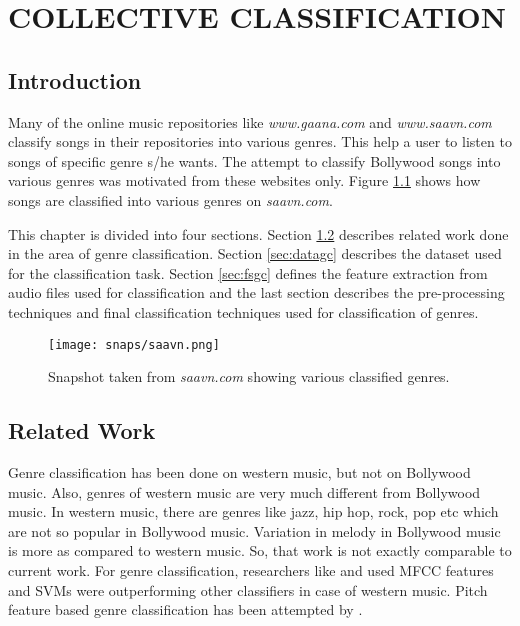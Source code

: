 \chapter{COLLECTIVE CLASSIFICATION}
 \label{chap:collective}
\section{Introduction}
Many of the online music repositories like \textit{www.gaana.com} and \textit{www.saavn.com} classify songs in their repositories into various genres. This help a user to listen to songs of specific genre s/he wants. The attempt to classify Bollywood songs into various genres was motivated from these websites only. Figure 
\ref{fig:saavn} shows how songs are classified into various genres on \textit{saavn.com}. 
\par This chapter is divided into four sections. Section \ref{sec:rwgc} describes related work done in the area of genre classification. Section \ref{sec:datagc} describes the dataset used for the classification task. Section \ref{sec:fsgc} defines the feature extraction from audio files used for classification and the last section describes the pre-processing techniques and final classification techniques used for classification of genres. 

\begin{figure}[!htpb]
   \begin{center}
	    \texttt{[image: snaps/saavn.png]}     
     \caption {Snapshot taken from \textit{saavn.com} showing various classified genres.}
   \label{fig:saavn}
   \end{center}
 \end{figure}
 
\section{Related Work} 
 \label{sec:rwgc}
Genre classification has been done on western music, but not on Bollywood music. Also, genres of western music are very much different from Bollywood music. In western music, there are genres like jazz, hip hop, rock, pop etc which are not so popular in Bollywood music. Variation in melody in Bollywood music is more as compared to western music. So, that work is not exactly comparable to current work. For genre classification, researchers like \cite{indexing} and \cite{socp} used MFCC features and SVMs were outperforming other classifiers in case of western music. Pitch feature based genre classification has been attempted by \cite{mel-genre}.

